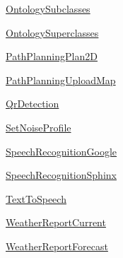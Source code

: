 \begin{DoxyCompactItemize}
\item 
\hyperlink{namespaceRappCloud_1_1CloudMsgs_1_1OntologySubclasses}{Ontology\-Subclasses}
\item 
\hyperlink{namespaceRappCloud_1_1CloudMsgs_1_1OntologySuperclasses}{Ontology\-Superclasses}
\item 
\hyperlink{namespaceRappCloud_1_1CloudMsgs_1_1PathPlanningPlan2D}{Path\-Planning\-Plan2\-D}
\item 
\hyperlink{namespaceRappCloud_1_1CloudMsgs_1_1PathPlanningUploadMap}{Path\-Planning\-Upload\-Map}
\item 
\hyperlink{namespaceRappCloud_1_1CloudMsgs_1_1QrDetection}{Qr\-Detection}
\item 
\hyperlink{namespaceRappCloud_1_1CloudMsgs_1_1SetNoiseProfile}{Set\-Noise\-Profile}
\item 
\hyperlink{namespaceRappCloud_1_1CloudMsgs_1_1SpeechRecognitionGoogle}{Speech\-Recognition\-Google}
\item 
\hyperlink{namespaceRappCloud_1_1CloudMsgs_1_1SpeechRecognitionSphinx}{Speech\-Recognition\-Sphinx}
\item 
\hyperlink{namespaceRappCloud_1_1CloudMsgs_1_1TextToSpeech}{Text\-To\-Speech}
\item 
\hyperlink{namespaceRappCloud_1_1CloudMsgs_1_1WeatherReportCurrent}{Weather\-Report\-Current}
\item 
\hyperlink{namespaceRappCloud_1_1CloudMsgs_1_1WeatherReportForecast}{Weather\-Report\-Forecast}
\end{DoxyCompactItemize}
